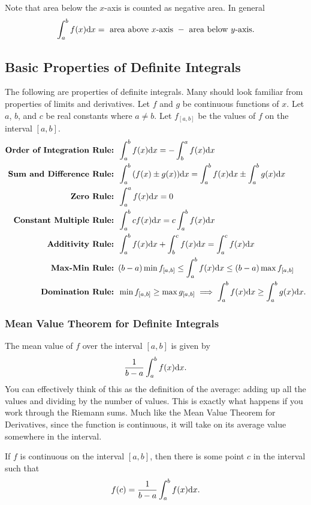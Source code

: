 Note that area below the $x$-axis is counted as negative area.
In general
\begin{equation*}
	\int_{a}^{b}{f(x)\mathrm{d} x} = \text{ area above $x$-axis } - \text{ area below $y$-axis}.
\end{equation*}

\subsection{Basic Properties of Definite Integrals}
The following are properties of definite integrals.
Many should look familiar from properties of limits and derivatives.
Let $f$ and $g$ be continuous functions of $x$.
Let $a$, $b$, and $c$ be real constants where $a \neq b$.
Let $f_{[a,b]}$ be the values of $f$ on the interval $[a,b]$.
\begin{align*}
	\textbf{Order of Integration Rule: }& \int_{a}^{b}{f(x)\mathrm{d} x} = -\int_{b}^{a}{f(x)\mathrm{d} x} \\
	\textbf{Sum and Difference Rule: }& \int_{a}^{b}{(f(x) \pm g(x))\mathrm{d} x} = \int_{a}^{b}{f(x)\mathrm{d} x} \pm \int_{a}^{b}{g(x)\mathrm{d} x} \\
	\textbf{Zero Rule: }& \int_{a}^{a}{f(x)\mathrm{d} x} = 0 \\
	\textbf{Constant Multiple Rule: }& \int_{a}^{b}{cf(x)\mathrm{d} x} = c\int_{a}^{b}{f(x)\mathrm{d} x} \\
	\textbf{Additivity Rule: }& \int_{a}^{b}{f(x)\mathrm{d} x} + \int_{b}^{c}{f(x)\mathrm{d} x} = \int_{a}^{c}{f(x)\mathrm{d} x} \\
	\textbf{Max-Min Rule: }& (b-a)\min{f_{[a,b]}} \leq \int_{a}^{b}{f(x)\mathrm{d} x} \leq (b-a)\max{f_{[a,b]}} \\
	\textbf{Domination Rule: }& \min{f_{[a,b]}} \geq \max{g_{[a,b]}} \implies \int_{a}^{b}{f(x)\mathrm{d} x} \geq \int_{a}^{b}{g(x)\mathrm{d} x}.
\end{align*}

\subsubsection{Mean Value Theorem for Definite Integrals}
The mean value of $f$ over the interval $[a,b]$ is given by
\begin{equation*}
	\frac{1}{b-a}\int_{a}^{b}{f(x)\mathrm{d} x}.
\end{equation*}
You can effectively think of this as the definition of the average: adding up all the values and dividing by the number of values.
This is exactly what happens if you work through the Riemann sums.
Much like the Mean Value Theorem for Derivatives, since the function is continuous, it will take on its average value somewhere in the interval.
\begin{theorem}
	If $f$ is continuous on the interval $[a,b]$, then there is some point $c$ in the interval such that
	\begin{equation*}
		f(c) = \frac{1}{b-a}\int_{a}^{b}{f(x)\mathrm{d} x}.
	\end{equation*}
\end{theorem}

